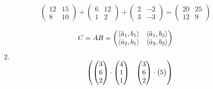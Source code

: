 \documentclass[12pt]{article}
\begin{document}
\begin{enumerate}
\begin{enumerate}
\begin{align*}
            \begin{pmatrix}
                12 & 15 \\
                8 & 10
            \end{pmatrix}
            + \begin{pmatrix}
                6 & 12 \\
                1 & 2
            \end{pmatrix}
            + \begin{pmatrix}
                2 & -2 \\
                3 & -3
            \end{pmatrix}
            = \begin{pmatrix}
                20 & 25 \\
                12 & 9
            \end{pmatrix}
        \end{align*}
        \item 
        \begin{align*}
            C = AB = 
            \begin{pmatrix}
                \langle \Tilde{a}_1, b_1 \rangle & \langle \Tilde{a}_1, b_2 \rangle \\
                \langle \Tilde{a}_2, b_1 \rangle & \langle \Tilde{a}_2, b_2 \rangle
            \end{pmatrix} \\ \\
            \begin{pmatrix}
                \begin{pmatrix}
                    3 \\
                    6 \\
                    2
                \end{pmatrix} \cdot
                \begin{pmatrix}
                    4 \\
                    1 \\
                    1
                \end{pmatrix} &
                \begin{pmatrix}
                    3 \\
                    6 \\
                    2
                \end{pmatrix} \cdot
                \begin{pmatrix}
                    5 \\

\end{pmatrix}
\end{pmatrix}
\end{align*}
\end{enumerate}
\end{enumerate}
\end{document}
